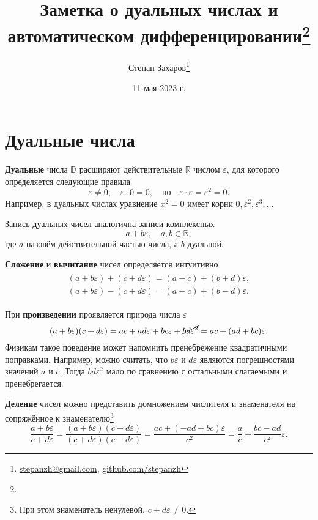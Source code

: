 \documentclass{article}
\title{Заметка о дуальных числах и автоматическом дифференцировании\footnote{\doclicenseLongText}}
\author{Степан Захаров\footnote{\href{mailto:stepanzh@gmail.com}{stepanzh@gmail.com}, \href{https://github.com/stepanzh/}{github.com/stepanzh}}}
\date{11 мая 2023 г.}
\newcommand{\dual}{\varepsilon}
\newcommand{\realset}{\mathbb{R}}
\newcommand{\dualset}{\mathbb{D}}
\theoremstyle{definition}
\begin{document}
\maketitle

\section{Дуальные числа}
\textbf{Дуальные} числа $\dualset$ расширяют действительные $\realset$ числом $\varepsilon$, для которого определяется следующие правила
\[
  \dual{}  \neq 0, \quad \dual{}  \cdot 0 = 0, \quad \text{но} \quad \dual{} \cdot \dual{}  = \dual{}^2 = 0
.\]
Например, в дуальных числах уравнение $x^2 = 0$ имеет корни $0, \dual{}^2, \dual{}^3,\dots$

Запись дуальных чисел аналогична записи комплексных
\[
  a + b \dual, \quad a, b \in \realset
,\]
где $a$ назовём действительной частью числа, а $b$ дуальной.

\textbf{Сложение} и \textbf{вычитание} чисел определяется интуитивно
\begin{align}\label{eq:dual_sumsub}
\begin{split}
  (a + b \dual) + (c + d \dual) = (a + c) + (b + d)\dual,
  \\
  (a + b \dual) - (c + d \dual) = (a - c) + (b - d)\dual.
\end{split}
\end{align}

При \textbf{произведении} проявляется природа числа $\dual$
\begin{equation}\label{eq:dual_mul}
  (a + b \dual)(c + d \dual) = ac + a d \dual + b c \dual + \cancel{b d \dual^2}
  = ac + (a d + b c)\dual
.\end{equation}
Физикам такое поведение может напомнить пренебрежение квадратичными поправками. Например, можно считать, что $b\dual$ и $d\dual$ являются погрешностями значений $a$ и $c$. Тогда $b d \dual^2$ мало по сравнению с остальными слагаемыми и пренебрегается.

\textbf{Деление} чисел можно представить домножением числителя и знаменателя на сопряжённое к знаменателю\footnote{При этом знаменатель ненулевой, $c + d\dual \neq 0$.}
\begin{equation}\label{eq:dual_div}
  \frac{a + b\dual}{c + d\dual}
  = \frac{(a + b\dual)(c - d \dual)}{(c + d\dual)(c - d\dual)}
  = \frac{ac + (-ad + bc)\dual}{c^2}
  = \frac{a}{c} + \frac{bc - ad}{c^2}\dual
.\end{equation}
\end{document}
